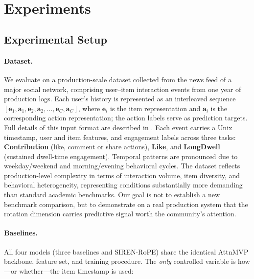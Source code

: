 \documentclass{article}
\begin{document}
\section{Experiments}
\label{sec:experiments}

\subsection{Experimental Setup}

\paragraph{Dataset.}
We evaluate on a production-scale dataset collected from the news feed of a
major social network, comprising user--item interaction events from one year
of production logs. Each user's history is represented as an interleaved
sequence $[\mathbf{e}_1, \mathbf{a}_1, \mathbf{e}_2, \mathbf{a}_2, \ldots,
\mathbf{e}_C, \mathbf{a}_C]$, where $\mathbf{e}_i$ is the item representation
and $\mathbf{a}_i$ is the corresponding action representation; the action
labels serve as prediction targets. Full details of this input format are
described in \citet{cheng2026}.
Each event carries a Unix timestamp, user and item features,
and engagement labels across three tasks: \textbf{Contribution} (like, comment or
share actions), \textbf{Like}, and \textbf{LongDwell} (sustained dwell-time
engagement). Temporal patterns are pronounced due to weekday/weekend and
morning/evening behavioral cycles. The dataset reflects production-level
complexity in terms of interaction volume, item diversity, and behavioral
heterogeneity, representing conditions substantially more demanding than
standard academic benchmarks. Our goal is not to establish a new benchmark
comparison, but to demonstrate on a real production system that the rotation
dimension carries predictive signal worth the community's attention.

\paragraph{Baselines.}
All four models (three baselines and SIREN-RoPE) share the identical AttnMVP
backbone, feature set, and training procedure.  The \emph{only} controlled
variable is how---or whether---the item timestamp is used:
\end{document}
